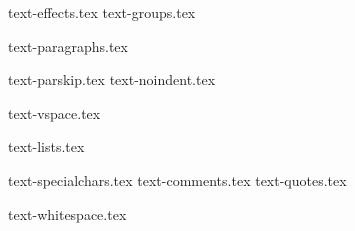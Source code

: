\documentclass[presentatie.tex]{subfiles}
\begin{document}
	
	\clearrecentlist
	
	{text-effects.tex}
	{text-groups.tex}

	{text-paragraphs.tex}

	{text-parskip.tex}
	{text-noindent.tex}

	{text-vspace.tex}
	
	{text-lists.tex}

	{text-specialchars.tex}
	{text-comments.tex}
	{text-quotes.tex}

	{text-whitespace.tex}
\end{document}
